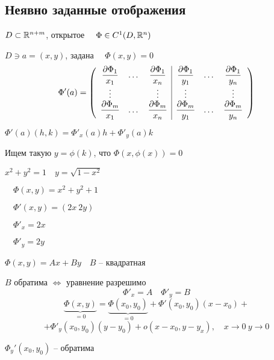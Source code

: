     \subsection*{Неявно заданные отображения}

    $D \subset \mathbb{R}^{n+m}$, открытое $\quad \Phi \in C^1(D, \mathbb{R}^n)$
    \par $D \ni a = (x, y)$, задана $\quad \Phi(x, y) = 0$
    \[
        \Phi'(a) = \left(\begin{array}{c c c | c c c}
            \dfrac{\partial \Phi_1}{x_1} & \dots & \dfrac{\partial \Phi_1}{x_n} & \dfrac{\partial \Phi_1}{y_1} & \dots & \dfrac{\partial \Phi_1}{y_n} \\
            \vdots & & \vdots & \vdots & & \vdots \\
            \dfrac{\partial \Phi_m}{x_1} & \dots & \dfrac{\partial \Phi_m}{x_n} & \dfrac{\partial \Phi_m}{y_1} & \dots & \dfrac{\partial \Phi_m}{y_n} \\
        \end{array}\right)
    \]

    \par $\Phi'(a)(h, k) = \Phi'_x(a)h + \Phi'_y(a)k$
    \par Ищем такую $y = \phi(k)$, что $\Phi(x, \phi(x)) = 0$

    \begin{illustration}
        $x^2 + y^2 = 1 \quad y = \sqrt{1 - x^2}$
        \par $\quad \Phi(x, y) = x^2 + y^2 + 1$
        \par $\quad \Phi'(x, y) = (2x \ 2y)$
        \par $\quad \Phi'_x = 2x$
        \par $\quad \Phi'_y = 2y$
    \end{illustration}

    \begin{illustration}
        $\Phi(x, y) = Ax + By \quad B$ -- квадратная
        \par \quad $B$ обратима $\Leftrightarrow$ уравнение разрешимо
        \[
            \Phi'_x = A \quad \Phi'_y = B    
        \]
        \[
            \underbrace{\Phi(x, y)}_{=0} = \underbrace{\Phi(x_0, y_0)}_{=0} + \Phi'(x_0, y_0)(x - x_0) +    
        \]
        \[
            + \Phi'_y(x_0, y_0)(y - y_0) + o(x-x_0, y-y_x), \quad x \rightarrow 0 \ y \rightarrow 0    
        \]
        \par $\Phi_y'(x_0, y_0)$ -- обратима
    \end{illustration}

